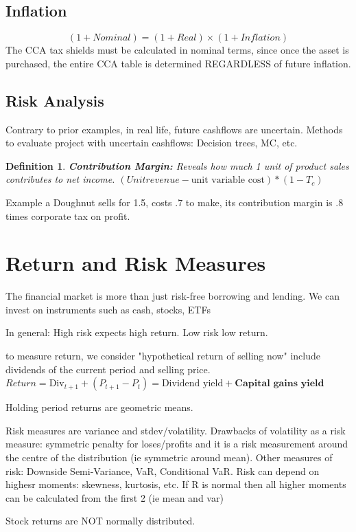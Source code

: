 \documentclass{article}
\newtheorem{definition}{Definition}
\begin{document}
\subsection{Inflation} 
\[ (1+Nominal) = (1+ Real) \times (1+Inflation) \]
The CCA tax shields must be calculated in nominal terms, since once the asset is purchased, the entire CCA table is determined REGARDLESS of future inflation. 

\subsection{Risk Analysis}
Contrary to prior examples, in real life, future cashflows are uncertain. Methods to evaluate project with uncertain cashflows: Decision trees, MC, etc.

\begin{definition}
\textbf{Contribution Margin:} Reveals how much 1 unit of product sales contributes to net income. $ (Unit revenue- \text{unit variable cost}) * (1-T_c) $
\end{definition}

Example a Doughnut sells for 1.5, costs .7 to make, its contribution margin is .8 times corporate tax on profit. 

\section{Return and Risk Measures}
The financial market is more than just risk-free borrowing and lending. We can invest on  instruments such as cash, stocks, ETFs

In general: High risk expects high return. Low risk low return. 

to measure return, we consider "hypothetical return of selling now" include dividends of the current period and selling price. 
$Return =  \text{Div}_{t+1} + (P_{t+1}-P_t) = \text{Dividend yield} + \textbf{Capital gains yield}$

Holding period returns are geometric means. 

Risk measures are variance and stdev/volatility.
Drawbacks of volatility as a risk measure: symmetric penalty for loses/profits and it is a risk measurement around the centre of the distribution (ie symmetric around mean). Other measures of risk: Downside Semi-Variance, VaR, 
Conditional VaR. Risk can depend on highesr moments: skewness, kurtosis, etc. If R is normal then all higher moments can be calculated from the first 2 (ie mean and var)

Stock returns are NOT normally distributed. 
\end{document}
